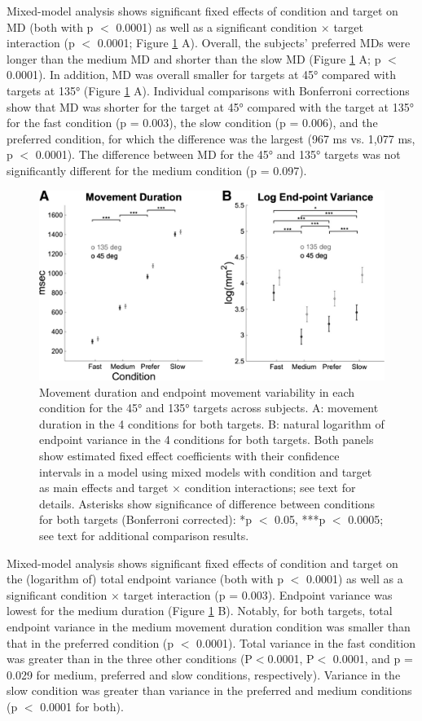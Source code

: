 Mixed-model analysis shows significant fixed effects of condition and target on MD (both with p $<$ 0.0001) as well as a significant condition $\times$ target interaction (p $<$ 0.0001; Figure \ref{fig:mt-data} A). Overall, the subjects’ preferred MDs were longer than the medium MD and shorter than the slow MD (Figure \ref{fig:mt-data} A; p $<$ 0.0001). In addition, MD was overall smaller for targets at \ang{45} compared with targets at \ang{135} (Figure \ref{fig:mt-data} A). Individual comparisons with Bonferroni corrections show that MD was shorter for the target at \ang{45} compared with the target at \ang{135} for the fast condition (p = 0.003), the slow condition (p = 0.006), and the preferred condition, for which the difference was the largest (967 ms vs. 1,077 ms, p $<$ 0.0001). The difference between MD for the \ang{45} and \ang{135} targets was not significantly different for the medium condition (p = 0.097). 

\begin{figure}
	\centering
	\includegraphics[width=0.8\linewidth]{figures/MT-data}
	\caption[Movement duration and endpoint movement variability]{Movement duration and endpoint movement variability in each condition for the \ang{45} and \ang{135} targets across subjects. A: movement duration in the 4 conditions for both targets. B: natural logarithm of endpoint variance in the 4 conditions for both targets. Both panels show estimated fixed effect coefficients with their confidence intervals in a model using mixed models with condition and target as main effects and target × condition interactions; see text for details. Asterisks show significance of difference between conditions for both targets (Bonferroni corrected): *p $<$ 0.05, ***p $<$ 0.0005; see text for additional comparison results.}
	\label{fig:mt-data}
\end{figure}


Mixed-model analysis shows significant fixed effects of condition and target on the (logarithm of) total endpoint variance (both with p $<$ 0.0001) as well as a significant condition $\times$ target interaction (p = 0.003). Endpoint variance was lowest for the medium duration (Figure \ref{fig:mt-data} B). Notably, for both targets, total endpoint variance in the medium movement duration condition was smaller than that in the preferred condition (p $<$ 0.0001). Total variance in the fast condition was greater than in the three other conditions (P$<$0.0001, P$<$ 0.0001, and p = 0.029 for medium, preferred and slow conditions, respectively). Variance in the slow condition was greater than variance in the preferred and medium conditions (p $<$ 0.0001 for both).

